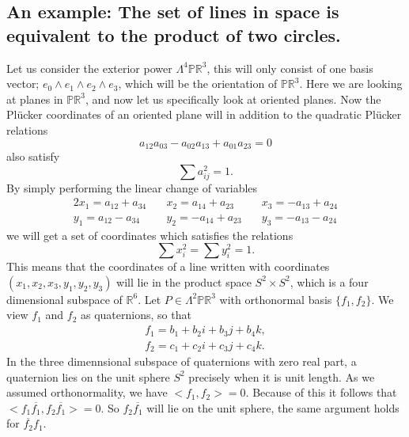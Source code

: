 \documentclass[a4paper,12pt]{book}
\theoremstyle{plain}
\theoremstyle{definition}
\begin{document}
\subsection{An example: The set of lines in space is equivalent to the product
of two circles.} %
\label{sub:connection_to_quaternion_algebra}
Let us consider the exterior power \( \Lambda^4 \mathbb{PR}^3 \), this will only
consist of one basis vector; \( e_0 \wedge e_1 \wedge e_2 \wedge e_3 \), which
will be the orientation of \( \mathbb{PR}^3 \). Here we are looking at planes
in \( \mathbb{PR}^3 \), and now let us specifically look at oriented planes.
Now the Pl\"ucker coordinates of an oriented plane will in addition to the
quadratic Pl\"ucker relations
\begin{equation} \label{line_rel}
	a_{12}a_{03} - a_{02}a_{13} + a_{01}a_{23} = 0
\end{equation}
also satisfy
\[
	\sum a_{ij}^2 = 1.
\]
By simply performing the linear change of variables
\begin{alignat*}{2}
	x_1 = a_{12} + a_{34} \quad & x_2 = a_{14} + a_{23} \quad & x_3 = -a_{13} + a_{24} \\
	y_1 = a_{12} - a_{34} \quad & y_2 = -a_{14} + a_{23} \quad & y_3 = -a_{13} - a_{24}
\end{alignat*}	
we will get a set of coordinates which satisfies the relations
\[
	\sum x_i^2 = \sum y_i^2 = 1.
\]
This means that the coordinates of a line written with coordinates
\( (x_1, x_2, x_3, y_1, y_2, y_3) \) will lie in the product space
\( S^2 \times S^2 \), which is a four dimensional subspace of
\( \mathbb{R}^6 \).
Let \( P \in \Lambda^2 \mathbb{PR}^3 \) with orthonormal basis \( \{f_1, f_2\} \).
We view \( f_1 \) and \( f_2 \) as quaternions, so that
\begin{align*}
	f_1 = b_1 + b_2 i + b_3 j + b_4 k, \\
	f_2 = c_1 + c_2 i + c_3 j + c_4 k.
\end{align*}
In the three dimennsional subspace of quaternions with zero real part, a quaternion
lies on the unit sphere \( S^2 \) precisely when it is unit length.
As we assumed orthonormality, we have \( <f_1, f_2> = 0 \). Because of this
it follows that \( <f_1 \overline{f_1}, f_2 \overline{f_1}> = 0\).
So \( f_2 \overline{f_1} \) will lie on the unit sphere, the same argument holds for
\( \overline{f_2} f_1 \).
\end{document}
